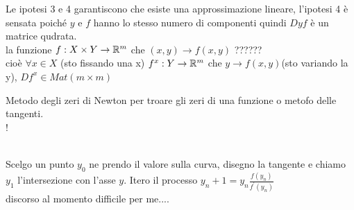 \observation
Le ipotesi 3 e 4 garantiscono che esiste una approssimazione lineare, l'ipotesi 4 è sensata poiché $y$ e $f$ hanno lo stesso numero di componenti quindi $Dyf$ è un matrice qudrata.\\
la funzione $f:X\times Y\rightarrow \mathbb{R}^m$ che $(x,y)\rightarrow f(x,y)$ ??????\\
cioè $\forall x\in X$ (sto fissando una x) $f^x:Y\rightarrow \mathbb{R}^m$ che $y\rightarrow f(x,y)$(sto variando la y), $Df^x\in Mat(m\times m)$

\observation Metodo degli zeri di Newton per troare gli zeri di una funzione o metofo delle tangenti.\\
\resizebox {\columnwidth} {!} {
}\\
Scelgo un punto $y_0$ ne prendo il valore sulla curva, disegno la tangente e chiamo $y_1$ l'intersezione con l'asse $y$. Itero il processo $y_n+1=y_n\frac{f(y_n)}{f^{'}(y_n)}$\\
discorso al momento difficile per me....\\

